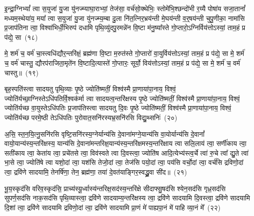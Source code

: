 {}%

इ॒न्द्रा॒ग्नि\-भ्यां᳚ त्वा स॒युजा॑ यु॒जा यु॑नज्म्याघा॒राभ्यां॒ तेज॑सा॒ वर्च॑सो॒क्थेभिः॒ स्तोमे॑भि॒श्छन्दो॑भी र॒य्यै पोषा॑य सजा॒तानां᳚ मध्यम॒स्थेया॑य॒ मया᳚ त्वा स॒युजा॑ यु॒जा यु॑नज्म्य॒म्बा दु॒ला नि॑त॒त्निर॒भ्रय॑न्ती मे॒घय॑न्ती व॒र्॒\mbox{}षय॑न्ती चुपु॒णीका॒ नामा॑सि प्र॒जा\-प॑तिना त्वा॒ विश्वा॑भिर्धी॒भिरुप॑ दधामि पृथि॒व्यु॑दपु॒रमन्ने॑न वि॒ष्टा म॑नु॒ष्या᳚स्ते गो॒प्तारो॒\-ऽग्निर्विय॑त्तो\-ऽस्यां॒ ताम॒हं प्र प॑द्ये॒ सा~(१८)

मे॒ शर्म॑ च॒ वर्म॑ चा॒स्त्वधि॑द्यौर॒न्तरि॑क्षं॒ ब्रह्म॑णा वि॒ष्टा म॒रुत॑स्ते गो॒प्तारो॑ वा॒युर्विय॑त्तो\-ऽस्यां॒ ताम॒हं प्र प॑द्ये॒ सा मे॒ शर्म॑ च॒ वर्म॑ चास्तु॒ द्यौरप॑राजिता॒मृते॑न वि॒ष्टादि॒त्यास्ते॑ गो॒प्तारः॒ सूर्यो॒ विय॑त्तो\-ऽस्यां॒ ताम॒हं प्र प॑द्ये॒ सा मे॒ शर्म॑ च॒ वर्म॑ चास्तु॥~(१९)

{\anuvakamend[{सा\-ऽष्टाच॑त्वारिꣳशच्च}]}%

बृह॒स्पति॑स्त्वा सादयतु पृथि॒व्याः पृ॒ष्ठे ज्योति॑ष्मतीं॒ विश्व॑स्मै प्रा॒णाया॑पा॒नाय॒ विश्वं॒ ज्योति॑र्यच्छा॒ग्निस्ते\-ऽधि॑पतिर्\-वि॒श्वक॑र्मा त्वा सादयत्व॒न्तरि॑क्षस्य पृ॒ष्ठे ज्योति॑ष्मतीं॒ विश्व॑स्मै प्रा॒णाया॑पा॒नाय॒ विश्वं॒ ज्योति॑र्यच्छ वा॒युस्ते\-ऽधि॑पतिः प्र॒जा\-प॑तिस्त्वा सादयतु दि॒वः पृ॒ष्ठे ज्योति॑ष्मतीं॒ विश्व॑स्मै प्रा॒णाया॑पा॒नाय॒ विश्वं॒ ज्योति॑र्यच्छ परमे॒ष्ठी ते\-ऽधि॑पतिः पुरोवात॒सनि॑रस्यभ्र॒सनि॑रसि विद्यु॒थ्सनिः॑~(२०)

अ॒सि॒ स्त॒न॒यि॒त्नु॒सनि॑रसि वृष्टि॒सनि॑रस्य॒ग्नेर्यान्य॑सि दे॒वाना॑मग्ने॒यान्य॑सि वा॒योर्यान्य॑सि दे॒वानां᳚ वायो॒यान्य॑स्य॒न्तरि॑क्षस्य॒ यान्य॑सि दे॒वाना॑मन्तरिक्ष॒यान्य॑स्य॒न्तरि॑क्षमस्य॒न्तरि॑क्षाय त्वा सलि॒लाय॑ त्वा॒ सर्णी॑काय त्वा॒ सती॑काय त्वा॒ केता॑य त्वा॒ प्रचे॑तसे त्वा॒ विव॑स्वते त्वा दि॒वस्त्वा॒ ज्योति॑ष आदि॒त्येभ्य॑स्त्व॒र्चे त्वा॑ रु॒चे त्वा᳚ द्यु॒ते त्वा॑ भा॒से त्वा॒ ज्योति॑षे त्वा यशो॒दां त्वा॒ यश॑सि तेजो॒दां त्वा॒ तेज॑सि पयो॒दां त्वा॒ पय॑सि वर्चो॒दां त्वा॒ वर्च॑सि द्रविणो॒दां त्वा॒ द्रवि॑णे सादयामि॒ तेनर्\mbox{}षि॑णा॒ तेन॒ ब्रह्म॑णा॒ तया॑ दे॒वत॑याङ्गिर॒स्वद्ध्रु॒वा सी॑द॥~(२१)

{\anuvakamend[{वि॒द्यु॒थ्सनि॑र्द्यु॒त्वैका॒न्नत्रि॒ꣳ॒शच्च॑}]}%

भू॒य॒स्कृद॑सि वरिव॒स्कृद॑सि॒ प्राच्य॑स्यू॒र्ध्वास्य॑न्तरिक्ष॒सद॑स्य॒न्तरि॑क्षे सीदाफ्सु॒षद॑सि श्येन॒सद॑सि गृध्र॒सद॑सि सुपर्ण॒सद॑सि नाक॒सद॑सि पृथि॒व्यास्त्वा॒ द्रवि॑णे सादयाम्य॒न्तरि॑क्षस्य त्वा॒ द्रवि॑णे सादयामि दि॒वस्त्वा॒ द्रवि॑णे सादयामि दि॒शां त्वा॒ द्रवि॑णे सादयामि द्रविणो॒दां त्वा॒ द्रवि॑णे सादयामि प्रा॒णं मे॑ पाह्यपा॒नं मे॑ पाहि व्या॒नं मे᳚~(२२)

